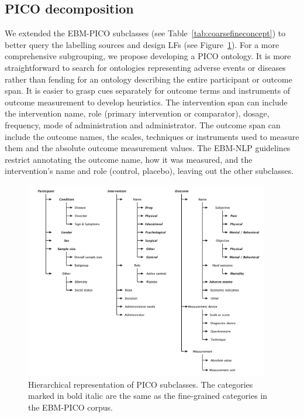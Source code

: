 \documentclass[10.7pt,]{article}
\begin{document}
\subsection{PICO decomposition}
%
We extended the EBM-PICO subclasses (see Table~\ref{tab:coarsefineconcept}) to better query the labelling sources and design LFs (see Figure~\ref{fig:target_subgroups}).
For a more comprehensive subgrouping, we propose developing a PICO ontology.\cite{sanchez2022annotated}
It is more straightforward to search for ontologies representing adverse events or diseases rather than fending for an ontology describing the entire participant or outcome span.
It is easier to grasp cues separately for outcome terms and instruments of outcome measurement to develop heuristics.
The intervention span can include the intervention name, role (primary intervention or comparator), dosage, frequency, mode of administration and administrator.
The outcome span can include the outcome names, the scales, techniques or instruments used to measure them and the absolute outcome measurement values.
The EBM-NLP guidelines restrict annotating the outcome name, how it was measured, and the intervention's name and role (control, placebo), leaving out the other subclasses.
%
\begin{figure}[!h]
\centering
\includegraphics[width=0.95\textwidth]{figures/target_subgroups_.pdf}
\caption{\label{fig:target_subgroups} Hierarchical representation of PICO subclasses. The categories marked in bold italic are the same as the fine-grained categories in the EBM-PICO corpus.}
\end{figure}
%
%
%
\end{document}

